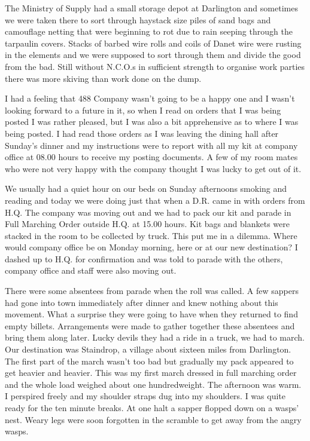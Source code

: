 The Ministry of Supply had a small storage depot at Darlington and
sometimes we were taken there to sort through haystack size piles of
sand bags and camouflage netting that were beginning to rot due to
rain seeping through the tarpaulin covers. Stacks of barbed wire rolls
and coils of Danet wire were rusting in the elements and we were
supposed to sort through them and divide the good from the bad. Still
without N.C.O.s in sufficient strength to organise work parties there
was more skiving than work done on the dump.

I had a feeling that 488 Company wasn't going to be a happy one and I
wasn't looking forward to a future in it, so when I read on orders
that I was being posted I was rather pleased, but I was also a bit
apprehensive as to where I was being posted. I had read those orders
as I was leaving the dining hall after Sunday's dinner and my
instructions were to report with all my kit at company office at 08.00
hours to receive my posting documents. A few of my room mates who
were not very happy with the company thought I was lucky to get out of
it. 

We usually had a quiet hour on our beds on Sunday afternoons smoking
and reading and today we were doing just that when a D.R. came in with
orders from H.Q. The company was moving out and we had to pack our
kit and parade in Full Marching Order outside H.Q. at 15.00 hours.
Kit bags and blankets were stacked in the room to be collected by
truck. This put me in a dilemma. Where would company office be on
Monday morning, here or at our new destination?  I dashed up to
H.Q. for confirmation and was told to parade with the others, company
office and staff were also moving out.

There were some absentees from parade when the roll was called. A few
sappers had gone into town immediately after dinner and knew nothing
about this movement. What a surprise they were going to have when
they returned to find empty billets. Arrangements were made to gather
together these absentees and bring them along later. Lucky devils
they had a ride in a truck, we had to march. Our destination was
Staindrop, a village about sixteen miles from Darlington. The first
part of the march wasn't too bad but gradually my pack appeared to get
heavier and heavier. This was my first march dressed in full marching
order and the whole load weighed about one hundredweight. The
afternoon was warm. I perspired freely and my shoulder straps dug
into my shoulders. I was quite ready for the ten minute breaks. At
one halt a sapper flopped down on a wasps' nest. Weary legs were soon
forgotten in the scramble to get away from the angry wasps.

